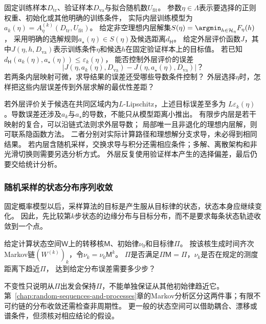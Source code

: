 \begin{mathproblem}[内层求解误差对外层目标与导数的影响]
  \label{question:future-nested-learning}
  固定训练样本$D_{\mathrm{tr}}$、验证样本$D_{\mathrm{va}}$与拟合随机数$U_{\mathrm{fit}}$。
  参数$\eta\in\Lambda$表示要选择的正则权重、初始化或其他明确的训练条件，
  实际内层训练模型为$a_k(\eta)=A_\eta^{(k)}(D_{\mathrm{tr}},U_{\mathrm{fit}})$。
  给定非空理想内层解集$S(\eta)=\argmin_{h\in\mathcal H_\eta}F_\eta(h)$，
  采用明确的选解规则$a_\star(\eta)\in S(\eta)$及候选距离$d_{\mathsf H}$。
  给定外层评价函数$J$，其中$J(\eta,h,D_{\mathrm{va}})$表示训练条件$\eta$和候选$h$在固定验证样本上的目标值。
  若已知$d_{\mathsf H}(a_k(\eta),a_\star(\eta))\leq\varepsilon_k(\eta)$，
  能否控制外层评价的误差
  \[
    \left|J(\eta,a_k(\eta),D_{\mathrm{va}})
          -J(\eta,a_\star(\eta),D_{\mathrm{va}})\right|\text{？}
  \]
  若两条内层映射可微，求导结果的误差还受哪些导数条件控制？
  外层选择$\eta$时，怎样把这些内层误差传到外层求解的最优性差距？
\end{mathproblem}

若外层评价关于候选在共同区域内为$L$-Lipschitz，上述目标误差至多为
$L\varepsilon_k(\eta)$。导数误差还涉及$a_k$与$a_\star$的导数，不能只从模型距离小推出。
有限步内层是若干映射的复合，可以沿链式法则求外层导数；
局部唯一且非退化的理想内层解，则可联系隐函数方法。
二者分别对实际计算路径和理想解分支求导，未必得到相同结果。
若内层含随机采样，交换求导与积分还需相应条件；多解、离散架构和非光滑切换则需要另选分析方式。
外层反复使用验证样本产生的选择偏差，最后仍要交给统计分析。

\subsubsection{随机采样的状态分布序列收敛}
\label{sec:future-analysis-sampling-dynamics}

固定概率模型以后，采样算法的目标是产生服从目标律的状态，状态本身应继续变化。
因此，先比较第$k$步状态的边缘分布与目标分布，而不是要求每条状态轨迹收敛到一个点。

\begin{mathproblem}[采样状态分布是否趋近目标分布]
  \label{question:future-sampling-dynamics}
  给定计算状态空间$\mathsf W$上的转移核$\mathsf M$、初始律$\nu_0$和目标律$\Pi$。
  按该核生成时间齐次Markov链$(W^{(k)})_k$，令$\nu_k=\nu_0\mathsf M^k$。
  $\Pi$是否满足$\Pi\mathsf M=\Pi$，$\nu_k$是否在规定的测度距离下趋近$\Pi$，
  达到给定分布误差需要多少步？
\end{mathproblem}

不变性只说明从$\Pi$出发会保持$\Pi$，不能单独保证从其他初始律趋近它。
第~\ref{chap:random-sequences-and-processes}章的Markov分析区分这两件事；有限不可约链的分布收敛还需检查非周期性。
更一般的状态空间可以借助耦合、漂移或谱条件，但须核对相应结论的假设。

